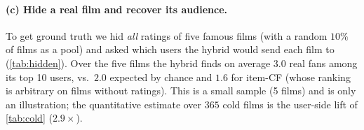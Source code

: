\begin{table}[H]\centering\small
\caption{New films: share of the 20 top-ranked users who liked at least one anchor film, vs.\ all users.}\label{tab:newfilm}\end{table}

\paragraph{(c) Hide a real film and recover its audience.} To get ground truth we hid \emph{all} ratings of five famous films (with a random $10\%$ of films as a pool) and asked which users the hybrid would send each film to (\cref{tab:hidden}). Over the five films the hybrid finds on average $3.0$ real fans among its top 10 users, vs.\ $2.0$ expected by chance and $1.6$ for item-CF (whose ranking is arbitrary on films without ratings). This is a small sample (5 films) and is only an illustration; the quantitative estimate over $365$ cold films is the user-side lift of \cref{tab:cold} ($2.9\times$).

\begin{table}[H]\centering\small
\caption{Hidden famous films: how many of the 10 users chosen by each method really liked the film.}\label{tab:hidden}\end{table}
